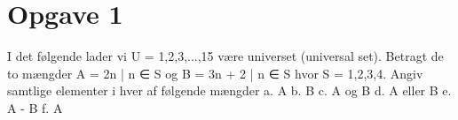 \section{Opgave 1}

I det følgende lader vi U = {1,2,3,...,15} være universet (universal set). Betragt de to mængder
A = 2n | n ∈ S og B = 3n + 2 | n ∈ S
hvor S = {1,2,3,4}.
Angiv samtlige elementer i hver af følgende mængder
a. A 
b. B
c. A og B 
d. A eller B 
e. A - B
f. A